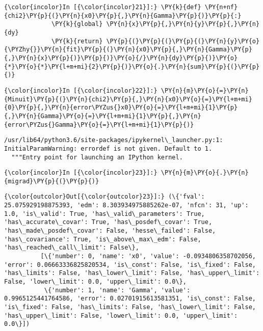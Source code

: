     \begin{Verbatim}[commandchars=\\\{\}]
{\color{incolor}In [{\color{incolor}21}]:} \PY{k}{def} \PY{n+nf}{chi2}\PY{p}{(}\PY{n}{x0}\PY{p}{,}\PY{n}{Gamma}\PY{p}{)}\PY{p}{:}
             \PY{k}{global} \PY{n}{x}\PY{p}{,}\PY{n}{y}\PY{p}{,}\PY{n}{dy}
             \PY{k}{return} \PY{p}{(}\PY{p}{(}\PY{p}{(}\PY{n}{y}\PY{o}{\PYZhy{}}\PY{n}{fit}\PY{p}{(}\PY{n}{x0}\PY{p}{,}\PY{n}{Gamma}\PY{p}{,}\PY{n}{x}\PY{p}{)}\PY{p}{)}\PY{o}{/}\PY{n}{dy}\PY{p}{)}\PY{o}{*}\PY{o}{*}\PY{l+m+mi}{2}\PY{p}{)}\PY{o}{.}\PY{n}{sum}\PY{p}{(}\PY{p}{)}
\end{Verbatim}


    \begin{Verbatim}[commandchars=\\\{\}]
{\color{incolor}In [{\color{incolor}22}]:} \PY{n}{m}\PY{o}{=}\PY{n}{Minuit}\PY{p}{(}\PY{n}{chi2}\PY{p}{,}\PY{n}{x0}\PY{o}{=}\PY{l+m+mi}{0}\PY{p}{,}\PY{n}{error\PYZus{}x0}\PY{o}{=}\PY{l+m+mi}{1}\PY{p}{,}\PY{n}{Gamma}\PY{o}{=}\PY{l+m+mi}{1}\PY{p}{,}\PY{n}{error\PYZus{}Gamma}\PY{o}{=}\PY{l+m+mi}{1}\PY{p}{)}
\end{Verbatim}


    \begin{Verbatim}[commandchars=\\\{\}]
/usr/lib64/python3.6/site-packages/ipykernel\_launcher.py:1: InitialParamWarning: errordef is not given. Default to 1.
  """Entry point for launching an IPython kernel.

    \end{Verbatim}

    \begin{Verbatim}[commandchars=\\\{\}]
{\color{incolor}In [{\color{incolor}23}]:} \PY{n}{m}\PY{o}{.}\PY{n}{migrad}\PY{p}{(}\PY{p}{)}
\end{Verbatim}


    
    
    
    
    
    
    
    
\begin{Verbatim}[commandchars=\\\{\}]
{\color{outcolor}Out[{\color{outcolor}23}]:} (\{'fval': 25.075929198875393, 'edm': 8.303934975885262e-07, 'nfcn': 31, 'up': 1.0, 'is\_valid': True, 'has\_valid\_parameters': True, 'has\_accurate\_covar': True, 'has\_posdef\_covar': True, 'has\_made\_posdef\_covar': False, 'hesse\_failed': False, 'has\_covariance': True, 'is\_above\_max\_edm': False, 'has\_reached\_call\_limit': False\},
          [\{'number': 0, 'name': 'x0', 'value': -0.0934806358702056, 'error': 0.06663336825820534, 'is\_const': False, 'is\_fixed': False, 'has\_limits': False, 'has\_lower\_limit': False, 'has\_upper\_limit': False, 'lower\_limit': 0.0, 'upper\_limit': 0.0\},
           \{'number': 1, 'name': 'Gamma', 'value': 0.9965125441764586, 'error': 0.02701915613581351, 'is\_const': False, 'is\_fixed': False, 'has\_limits': False, 'has\_lower\_limit': False, 'has\_upper\_limit': False, 'lower\_limit': 0.0, 'upper\_limit': 0.0\}])
\end{Verbatim}
            
